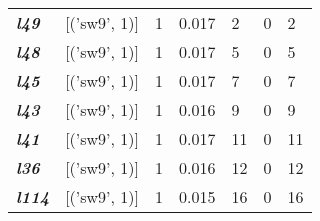 \begin{table}
\begin{tabular}{lllllll}
    \textit{\textbf{l49}}                                           & {[}('sw9', 1){]}  & 1                                 & 0.017                                  & 2                                  & 0                                  & 2                               \\
    \textit{\textbf{l48}}                                           & {[}('sw9', 1){]}  & 1                                 & 0.017                                  & 5                                  & 0                                  & 5                               \\
    \textit{\textbf{l45}}                                           & {[}('sw9', 1){]}  & 1                                 & 0.017                                  & 7                                  & 0                                  & 7                               \\
    \textit{\textbf{l43}}                                           & {[}('sw9', 1){]}  & 1                                 & 0.016                                  & 9                                  & 0                                  & 9                               \\
    \textit{\textbf{l41}}                                           & {[}('sw9', 1){]}  & 1                                 & 0.017                                  & 11                                 & 0                                  & 11                              \\
    \textit{\textbf{l36}}                                           & {[}('sw9', 1){]}  & 1                                 & 0.016                                  & 12                                 & 0                                  & 12                              \\
    \textit{\textbf{l114}}                                          & {[}('sw9', 1){]}  & 1                                 & 0.015                                  & 16                                 & 0                                  & 16                              \\ \hline
    \end{tabular}
    \end{table}